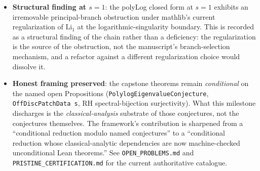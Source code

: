 \begin{itemize}
\item \textbf{Structural finding at $s = 1$}: the polyLog closed form at $s = 1$ exhibits an irremovable principal-branch obstruction under mathlib's current regularization of $\mathrm{Li}_1$ at the logarithmic-singularity boundary. This is recorded as a structural finding of the chain rather than a deficiency: the regularization is the source of the obstruction, not the manuscript's branch-selection mechanism, and a refactor against a different regularization choice would dissolve it.
\item \textbf{Honest framing preserved}: the capstone theorems remain \emph{conditional} on the named open Propositions (\texttt{PolylogEigenvalueConjecture}, \texttt{OffDiscPatchData s}, RH spectral-bijection surjectivity). What this milestone discharges is the \emph{classical-analysis} substrate of those conjectures, not the conjectures themselves. The framework's contribution is sharpened from a ``conditional reduction modulo named conjectures'' to a ``conditional reduction whose classical-analytic dependencies are now machine-checked unconditional Lean theorems.'' See \texttt{OPEN\_PROBLEMS.md} and \texttt{PRISTINE\_CERTIFICATION.md} for the current authoritative catalogue.
\end{itemize}

